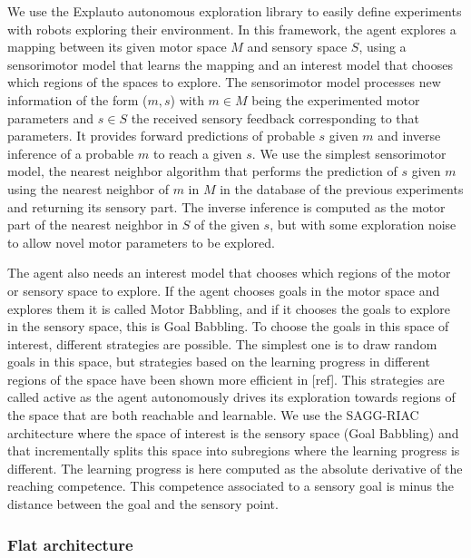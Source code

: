 \documentclass[10pt,letterpaper]{article}
\begin{document}
			We use the Explauto autonomous exploration library \cite{moulin-frier_explauto:_2014} to easily define experiments with robots exploring their environment. 
			In this framework, the agent explores a mapping between its given motor space $M$ and sensory space $S$, 
			using a sensorimotor model that learns the mapping and an interest model that chooses which regions of the spaces to explore.
			The sensorimotor model processes new information of the form ($m, s$) with $m \in M$ being the experimented motor parameters and $s \in S$ the received sensory feedback 
			corresponding to that parameters. 
			It provides forward predictions of probable $s$ given $m$ and inverse inference of a probable $m$ to reach a given $s$.
			We use the simplest sensorimotor model, the nearest neighbor algorithm 
			that performs the prediction of $s$ given $m$ using the nearest neighbor of $m$ in $M$ in the database of the previous experiments and returning its sensory part. 
			The inverse inference is computed as the motor part of the nearest neighbor in $S$ of the given $s$, but with some exploration noise to allow novel motor parameters to be explored.
			
			The agent also needs an interest model that chooses which regions of the motor or sensory space to explore.
			If the agent chooses goals in the motor space and explores them it is called Motor Babbling, and if it chooses the goals to explore in the sensory space, this is Goal Babbling.
			To choose the goals in this space of interest, different strategies are possible. 
			The simplest one is to draw random goals in this space, but strategies based on the learning progress in different regions of the space have been shown more efficient in [ref].
			This strategies are called active as the agent autonomously drives its exploration towards regions of the space that are both reachable and learnable. 
			We use the SAGG-RIAC architecture \cite{baranes_active_2013} where the space of interest is the sensory space (Goal Babbling) and that incrementally splits this space into subregions where the learning progress 
			is different. 
			The learning progress is here computed as the absolute derivative of the reaching competence. 
			This competence associated to a sensory goal is minus the distance between the goal and the sensory point.
			
				
		
		\subsubsection{Flat architecture}
			
\end{document}
